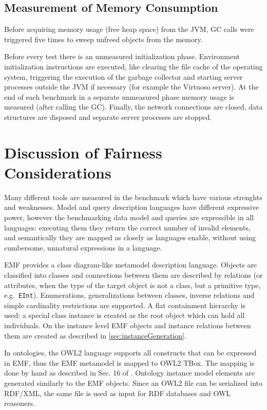 \subsection{Measurement of Memory Consumption}
Before acquiring memory usage (free heap space) from the JVM, GC calls were triggered five times to sweep unfreed objects from the memory.

Before every test
there is an unmeasured initialization phase. Environment initialization
instructions are executed, like clearing the file cache of the operating system, triggering the
execution of the garbage collector and starting server processes outside the
JVM if necessary (for example the Virtuoso server). At the end of each benchmark
in a separate unmeasured phase memory usage is measured (after calling the GC).
Finally, the network connections are closed, data structures are disposed and
separate server processes are stopped.


\section{Discussion of Fairness Considerations}
Many different tools are measured in the benchmark which have various strenghts
and weaknesses. Model and query description languages have different expressive
power, however the benchmarking data model and queries are expressible in all
languages: executing them they return the correct number of invalid elements,
and semantically they are mapped as closely as languages enable, without using
cumbersome, unnatural expressions in a language.

EMF provides a class diagram-like metamodel description language. Objects are
classified into classes and connections between them are described by relations
(or attributes, when the type of the target object is not a class, but a primitive
type, e.g.\ \texttt{EInt}). Enumerations, generalizations between classes, inverse
relations and simple cardinality restrictions are supported. A flat containment
hierarchy is used: a special class instance is created as the root object which can
hold all individuals. On the instance level EMF objects and instance relations between them 
are created as described in \autoref{sec:instanceGeneration}.

In ontologies, the OWL2 language supports all constructs that can be expressed in
EMF, thus the EMF metamodel is mapped to OWL2 TBox. The mapping is done by hand as
described in Sec. 16 of \cite{OMG2009ODM}. Ontology instance model elements are
generated similarly to the EMF objects. Since an OWL2 file can be serialized
into RDF/XML, the same file is used as input for RDF databases and OWL
reasoners.

